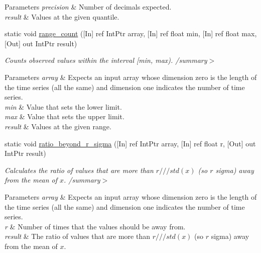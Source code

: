 \begin{DoxyCompactItemize}
\begin{DoxyCompactList}
\begin{DoxyParams}{Parameters}
\hline
{\em precision} & Number of decimals expected.\\
\hline
{\em result} & Values at the given quantile.\\
\hline
\end{DoxyParams}
\end{DoxyCompactList}\item 
static void \mbox{\hyperlink{classkhiva_1_1interop_1_1_d_l_l_features_a790bcab1d5066bd065a6c4b249e0f3a9}{range\+\_\+count}} (\mbox{[}In\mbox{]} ref Int\+Ptr array, \mbox{[}In\mbox{]} ref float min, \mbox{[}In\mbox{]} ref float max, \mbox{[}Out\mbox{]} out Int\+Ptr result)
\begin{DoxyCompactList}\small\item\em Counts observed values within the interval \mbox{[}min, max). /summary$>$ 
\begin{DoxyParams}{Parameters}
{\em array} & Expects an input array whose dimension zero is the length of the time series (all the same) and dimension one indicates the number of time series.\\
\hline
{\em min} & Value that sets the lower limit.\\
\hline
{\em max} & Value that sets the upper limit.\\
\hline
{\em result} & Values at the given range.\\
\hline
\end{DoxyParams}
\end{DoxyCompactList}\item 
static void \mbox{\hyperlink{classkhiva_1_1interop_1_1_d_l_l_features_a29791b93875f52914a3f42a6682c0bb7}{ratio\+\_\+beyond\+\_\+r\+\_\+sigma}} (\mbox{[}In\mbox{]} ref Int\+Ptr array, \mbox{[}In\mbox{]} ref float r, \mbox{[}Out\mbox{]} out Int\+Ptr result)
\begin{DoxyCompactList}\small\item\em Calculates the ratio of values that are more than $r///std(x)$ (so $r$ sigma) away from the mean of $x$. /summary$>$ 
\begin{DoxyParams}{Parameters}
{\em array} & Expects an input array whose dimension zero is the length of the time series (all the same) and dimension one indicates the number of time series.\\
\hline
{\em r} & Number of times that the values should be away from.\\
\hline
{\em result} & The ratio of values that are more than $r///std(x)$ (so $r$ sigma) away from the mean of $x$.\\
\hline
\end{DoxyParams}

\end{DoxyCompactList}
\end{DoxyCompactItemize}
